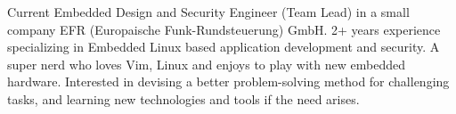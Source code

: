

\begin{cvparagraph}

Current Embedded Design and Security Engineer (Team Lead) in a small company EFR (Europaische Funk-Rundsteuerung) GmbH. 2+ years experience specializing in Embedded Linux based application development and security. A super nerd who loves Vim, Linux and enjoys to play with new embedded hardware. Interested in devising a better problem-solving method for challenging tasks, and learning new technologies and tools if the need arises. 
\end{cvparagraph}
